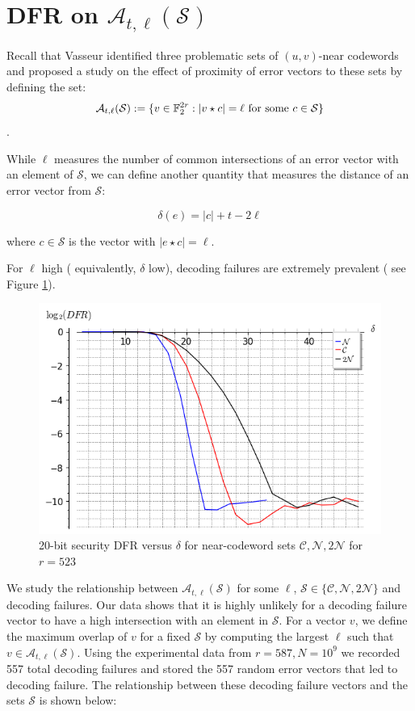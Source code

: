 \section{DFR on $\mathcal{A}_{t,\ell}(\mathcal{S})$}

Recall that Vasseur identified three problematic sets of $(u,v)$-near codewords and proposed a study on the effect of proximity of error vectors to these sets by defining the set: $$\mathcal{A}_{t,\ell}(\mathcal{S}) := \{v \in \mathbb{F}_2^{2r} : |v \star c| = \ell \text{ for some } c \in \mathcal{S} \}$$.

While $\ell$ measures the number of common intersections of an error vector with an element of $\mathcal{S}$, we can define another quantity that measures the distance of an error vector from $\mathcal{S}$:

\[
\delta(e) = |c| + t - 2\ell
\]

where $c\in \mathcal{S}$ is the vector with $|e \star c| = \ell$.

For $\ell$ high ( equivalently, $\delta$ low), decoding failures are extremely prevalent ( see Figure \ref{fig:DFR_CN2N}).

\begin{figure}[h]
    \centering
    \includegraphics[scale=.75]{2_bike/DFR_20bit_CN2N_new.png}
    \caption{20-bit security DFR versus $\delta$ for near-codeword sets  $\mathcal{C},\mathcal{N}, 2\mathcal{N}$ for $r = 523$}
    \label{fig:DFR_CN2N}
\end{figure}

We study the relationship between $\mathcal{A}_{t,\ell}(\mathcal{S})$ for some $\ell$, $\mathcal{S} \in \{ \mathcal{C}, \mathcal{N}, 2\mathcal{N} \}$ and decoding failures. Our data shows that it is highly unlikely for a decoding failure vector to have a high intersection with an element in $\mathcal{S}$. For a vector $v$, we define the maximum overlap of $v$ for a fixed $\mathcal{S}$ by computing the largest $\ell$ such that $v \in \mathcal{A}_{t,\ell}(\mathcal{S})$. Using the experimental data from $r=587, N=10^9$ we recorded 557 total decoding failures and stored the 557 random error vectors that led to decoding failure. The relationship between these decoding failure vectors and the sets $\mathcal{S} $ is shown below:


